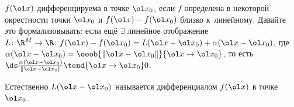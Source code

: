 \label{DIFF}
	 $f(\ol x)$ дифференцируема в точке $\ol x_0$, если $f$ определена в некоторой окрестности точки $\ol x_0$ и
	 $f(\ol x) - f(\ol x_0)$ близко к~линейному. Давайте это формализовывать:
	 если ещё $\exists$ линейное отображение $L\colon \R^M\to \R\colon f(\ol x) - f(\ol x_0) = L(\ol x - \ol x_0) + \alpha (\ol x - \ol x_0)$,
	 где $\alpha(\ol x- \ol x_0) = \ooob{\|\ol x - \ol x_0\|}{\ol x\to \ol x_0}$, то есть $\ds\frac{\alpha(\ol x- \ol x_0)}{\|\ol x - \ol x_0\|}\tend{\ol x\to \ol x_0}0$.
	 
	 Естественно $L(\ol x - \ol x_0)$ называется дифференциалом $f(\ol x)$ в точке $\ol x_0$. 
	 